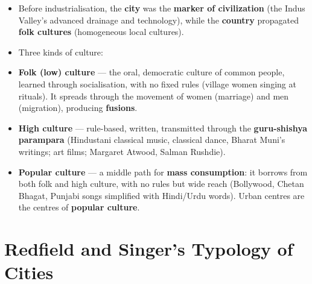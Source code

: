 \begin{KeyConcept}
\begin{itemize}
\item Before industrialisation, the \textbf{city} was the \textbf{marker of civilization} (the Indus Valley's advanced drainage and technology), while the \textbf{country} propagated \textbf{folk cultures} (homogeneous local cultures).
\item Three kinds of culture:
\item \textbf{Folk (low) culture} --- the oral, democratic culture of common people, learned through socialisation, with no fixed rules (village women singing at rituals). It spreads through the movement of women (marriage) and men (migration), producing \textbf{fusions}.
\item \textbf{High culture} --- rule-based, written, transmitted through the \textbf{guru-shishya parampara} (Hindustani classical music, classical dance, Bharat Muni's writings; art films; Margaret Atwood, Salman Rushdie).
\item \textbf{Popular culture} --- a middle path for \textbf{mass consumption}: it borrows from both folk and high culture, with no rules but wide reach (Bollywood, Chetan Bhagat, Punjabi songs simplified with Hindi/Urdu words). Urban centres are the centres of \textbf{popular culture}.
\end{itemize}
\end{KeyConcept}

\section{Redfield and Singer's Typology of Cities}

